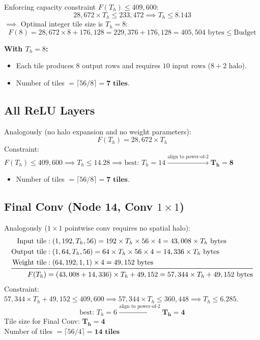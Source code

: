 \documentclass[11pt,a4paper]{article}
\begin{document}
Enforcing capacity constraint $F(T_h) \le 409,600$:
$$28,672 \times T_h \le 233,472 \implies T_h \le 8.143$$
$\implies$ Optimal integer tile size is $T_h = 8$:
$$F(8) = 28,672 \times 8 + 176,128 = 229,376 + 176,128 = 405,504\text{ bytes} \le \text{Budget}$$

\textbf{With $T_h = 8$:}
\begin{itemize}
    \item Each tile produces $8\text{ output rows}$ and requires $10\text{ input rows}$ ($8 + 2\text{ halo}$).
    \item Number of tiles $= \lceil 56/8 \rceil = \mathbf{7\text{ tiles}}$.
\end{itemize}

\subsection{All ReLU Layers}
Analogously (no halo expansion and no weight parameters):
$$F(T_h) = 28,672 \times T_h$$
Constraint: $F(T_h) \le 409,600 \implies T_h \le 14.28 \implies \text{best: } T_h = 14 \xrightarrow{\text{align to power-of-2}} \mathbf{T_h = 8}$
\begin{itemize}
    \item Number of tiles $= \lceil 56/8 \rceil = \mathbf{7\text{ tiles}}$.
\end{itemize}

\newpage

\subsection{Final Conv (Node 14, Conv $1\times 1$)}
Analogously ($1\times 1$ pointwise conv requires no spatial halo):
\begin{align*}
\text{Input tile} &: (1, 192, T_h, 56) = 192 \times T_h \times 56 \times 4 = 43,008 \times T_h\text{ bytes} \\
\text{Output tile} &: (1, 64, T_h, 56) = 64 \times T_h \times 56 \times 4 = 14,336 \times T_h\text{ bytes} \\
\text{Weight tile} &: (64, 192, 1, 1) \times 4 = 49,152\text{ bytes} \\
\midrule
F(T_h) &= (43,008 + 14,336) \times T_h + 49,152 = 57,344 \times T_h + 49,152\text{ bytes}
\end{align*}
Constraint: $57,344 \times T_h + 49,152 \le 409,600 \implies 57,344 \times T_h \le 360,448 \implies T_h \le 6.285$.
$$\text{best: } T_h = 6 \xrightarrow{\text{align to power-of-2}} \mathbf{T_h = 4}$$
Tile size for Final Conv: $\mathbf{T_h = 4}$ \\
Number of tiles $= \lceil 56/4 \rceil = \mathbf{14\text{ tiles}}$
\end{document}
